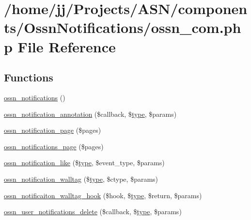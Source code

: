 \hypertarget{_ossn_notifications_2ossn__com_8php}{}\section{/home/jj/\+Projects/\+A\+S\+N/components/\+Ossn\+Notifications/ossn\+\_\+com.php File Reference}
\label{_ossn_notifications_2ossn__com_8php}
\subsection*{Functions}
\begin{DoxyCompactItemize}
\item 
\hyperlink{_ossn_notifications_2ossn__com_8php_ab2b4e6857fa4ab775e70e28fa8daa4e8}{ossn\+\_\+notifications} ()
\item 
\hyperlink{_ossn_notifications_2ossn__com_8php_a7fce23bf42761d7c49d6639d5c98e640}{ossn\+\_\+notification\+\_\+annotation} (\$callback, \$\hyperlink{_ossn_wall_2actions_2wall_2post_2group_8php_a2dc1bb4e1ed0029daa81ac0776b14b51}{type}, \$params)
\item 
\hyperlink{_ossn_notifications_2ossn__com_8php_ab732067752f99cb6556ebd7bc1f093c5}{ossn\+\_\+notification\+\_\+page} (\$pages)
\item 
\hyperlink{_ossn_notifications_2ossn__com_8php_a3ff8cf075c13d00cda524d890e326c35}{ossn\+\_\+notifications\+\_\+page} (\$pages)
\item 
\hyperlink{_ossn_notifications_2ossn__com_8php_aa945c57a7f800858c810f1744258373b}{ossn\+\_\+notification\+\_\+like} (\$\hyperlink{_ossn_wall_2actions_2wall_2post_2group_8php_a2dc1bb4e1ed0029daa81ac0776b14b51}{type}, \$event\+\_\+type, \$params)
\item 
\hyperlink{_ossn_notifications_2ossn__com_8php_a3ea9168f828e6037ece3a9e0d96171bb}{ossn\+\_\+notification\+\_\+walltag} (\$\hyperlink{_ossn_wall_2actions_2wall_2post_2group_8php_a2dc1bb4e1ed0029daa81ac0776b14b51}{type}, \$ctype, \$params)
\item 
\hyperlink{_ossn_notifications_2ossn__com_8php_a9b1179ea228796384d4712b3ae5e2c91}{ossn\+\_\+notificaiton\+\_\+walltag\+\_\+hook} (\$hook, \$\hyperlink{_ossn_wall_2actions_2wall_2post_2group_8php_a2dc1bb4e1ed0029daa81ac0776b14b51}{type}, \$return, \$params)
\item 
\hyperlink{_ossn_notifications_2ossn__com_8php_aeb2877470abaeeea7b681215831468f7}{ossn\+\_\+user\+\_\+notifications\+\_\+delete} (\$callback, \$\hyperlink{_ossn_wall_2actions_2wall_2post_2group_8php_a2dc1bb4e1ed0029daa81ac0776b14b51}{type}, \$params)

\end{DoxyCompactItemize}
